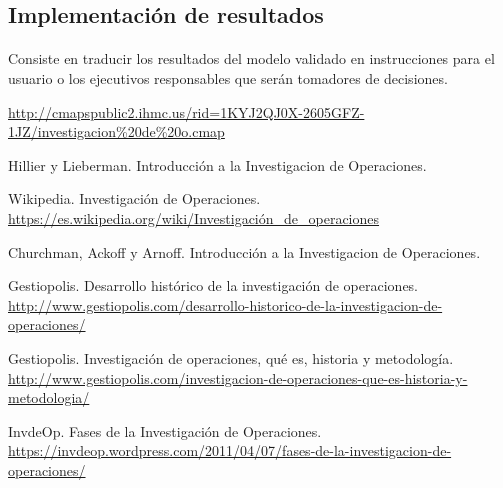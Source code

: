 \documentclass[12pt, a4paper,spanish]{article}
\begin{document}
		\subsection{Implementación de resultados}

			\paragraph{}
			Consiste en traducir los resultados del modelo validado en instrucciones para el usuario o los ejecutivos responsables que serán tomadores de decisiones.\cite{invdeop_IO}


	\begin{thebibliography}{9}


		\url{http://cmapspublic2.ihmc.us/rid=1KYJ2QJ0X-2605GFZ-1JZ/investigacion%20de%20o.cmap}

		Hillier y Lieberman. Introducción a la Investigacion de Operaciones.

		Wikipedia. Investigación de Operaciones. \\
		\url{https://es.wikipedia.org/wiki/Investigación_de_operaciones}

		Churchman, Ackoff y Arnoff. Introducción a la Investigacion de Operaciones.

		Gestiopolis. Desarrollo histórico de la investigación de operaciones. \\
		\url{http://www.gestiopolis.com/desarrollo-historico-de-la-investigacion-de-operaciones/}

		Gestiopolis. Investigación de operaciones, qué es, historia y metodología. \\
		\url{http://www.gestiopolis.com/investigacion-de-operaciones-que-es-historia-y-metodologia/}

		InvdeOp. Fases de la Investigación de Operaciones. \\
		\url{https://invdeop.wordpress.com/2011/04/07/fases-de-la-investigacion-de-operaciones/}

	\end{thebibliography}
\end{document}
